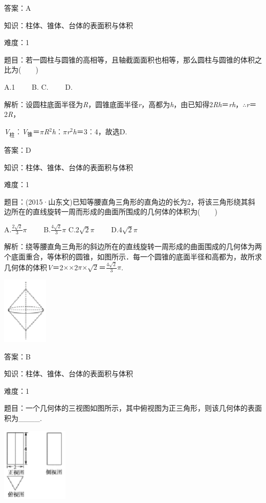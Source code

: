 \documentclass{article} %
\begin{document}
答案：A

知识：柱体、锥体、台体的表面积与体积

难度：1

题目：若一圆柱与圆锥的高相等，且轴截面面积也相等，那么圆柱与圆锥的体积之比为(　　)

A.1　　 B. C.　　 D.

解析：设圆柱底面半径为\textit{R}，圆锥底面半径\textit{r}，高都为\textit{h}，由已知得2\textit{Rh}＝\textit{rh}，$\mathrm{\therefore}$\textit{r}＝2\textit{R}，

\textit{V}${}_{\textrm{柱}}$︰\textit{V}${}_{\textrm{锥}}$＝$\pi$\textit{R}${}^{2}$\textit{h}︰$\pi$\textit{r}${}^{2}$\textit{h}＝3︰4，故选D.

答案：D

知识：柱体、锥体、台体的表面积与体积

难度：1

题目：(2015·山东文)已知等腰直角三角形的直角边的长为2，将该三角形绕其斜边所在的直线旋转一周而形成的曲面所围成的几何体的体积为(　　)

A.$\frac{2\sqrt{2}}{3}\pi$　　 B.$\frac{4\sqrt{2}}{3}\pi$ C.2$\sqrt{2}\pi$　　 D.4$\sqrt{2}\pi$

解析：绕等腰直角三角形的斜边所在的直线旋转一周形成的曲面围成的几何体为两个底面重合，等体积的圆锥，如图所示．每一个圆锥的底面半径和高都为，故所求几何体的体积\textit{V}＝2$\mathrm{\times}$$\mathrm{\times}$2$\pi$$\mathrm{\times}\sqrt{2}$＝$\frac{4\sqrt{2}}{3}\pi$.

\includegraphics*[width=0.85in, height=1.27in, keepaspectratio=false]{image64}

答案：B

知识：柱体、锥体、台体的表面积与体积

难度：1

题目：一个几何体的三视图如图所示，其中俯视图为正三角形，则该几何体的表面积为\_\_\_\_.

\includegraphics*[width=1.25in, height=1.40in, keepaspectratio=false]{image65}
\end{document}
